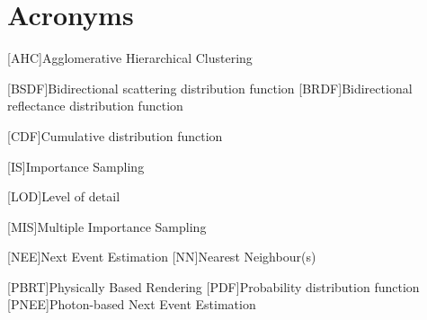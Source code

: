 \newpage
\section*{Acronyms}

\begin{acronym}[ECU]


[AHC]{Agglomerative Hierarchical Clustering}


[BSDF]{Bidirectional scattering distribution function}
[BRDF]{Bidirectional reflectance distribution function}

[CDF]{Cumulative distribution function}

[IS]{Importance Sampling}

[LOD]{Level of detail}

[MIS]{Multiple Importance Sampling}

[NEE]{Next Event Estimation}
[NN]{Nearest Neighbour(s)}

[PBRT]{Physically Based Rendering}
[PDF]{Probability distribution function}
[PNEE]{Photon-based Next Event Estimation}


\end{acronym}

